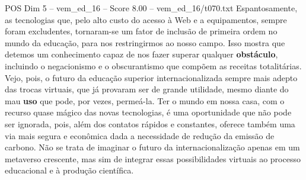\begin{textsample}{POS Dim 5 – vem\_ed\_16 – Score 8.00 – vem\_ed\_16/t070.txt}
Espantosamente, as tecnologias que, pelo alto custo do acesso à Web e a equipamentos, sempre foram excludentes, tornaram-se um fator de inclusão de primeira ordem no mundo da educação, para nos restringirmos ao nosso campo.
Isso mostra que detemos um conhecimento capaz de nos fazer superar qualquer \textbf{obstáculo}, incluindo o negacionismo e o obscurantismo que compõem as receitas totalitárias.
Vejo, pois, o futuro da educação superior internacionalizada sempre mais adepto das trocas virtuais, que já provaram ser de grande utilidade, mesmo diante do mau \textbf{uso} que pode, por vezes, permeá-la.
Ter o mundo em nossa casa, com o recurso quase mágico das novas tecnologias, é uma oportunidade que não pode ser ignorada, pois, além dos contatos rápidos e constantes, oferece também uma via mais segura e econômica dada a necessidade de redução da emissão de carbono.
Não se trata de imaginar o futuro da internacionalização apenas em um metaverso crescente, mas sim de integrar essas possibilidades virtuais ao processo educacional e à produção científica.

\end{textsample}
